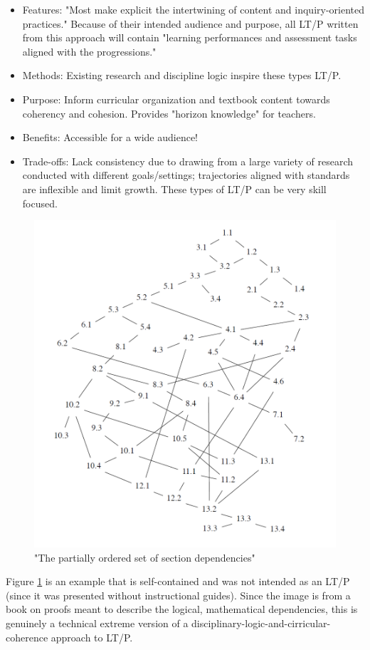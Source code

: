 \documentclass{TC}
\begin{document}
\begin{multicols}{2}
\begin{itemize} 
\item Features: "Most make explicit the intertwining of content and inquiry-oriented practices." Because of their intended audience and purpose, all LT/P written from this approach will contain "learning performances and assessment tasks aligned with the progressions."
\item Methods: Existing research and discipline logic inspire these types LT/P.
\item Purpose: Inform curricular organization and textbook content towards coherency and cohesion. Provides "horizon knowledge" for teachers. 
\item Benefits: Accessible for a wide audience!
\item Trade-offs: Lack consistency due to drawing from a large variety of research conducted with different goals/settings; trajectories aligned with standards are inflexible and limit growth. These types of LT/P can be very skill focused.  
 \end{itemize}
 \end{multicols}

\begin{figure}[h]
\centering
\includegraphics[width=.6\textwidth]{AoP_poset_of_section_dependencies} 
 \caption{"The partially ordered set of section dependencies" \parencite{beck_computing_2016}
\label{disciplinary_logic_LT_example}}
 \end{figure}
  
\begin{remark} Figure \ref{disciplinary_logic_LT_example} is an example that is self-contained and was not intended as an LT/P (since it was presented without instructional guides). Since the image is from a book on proofs meant to describe the logical, mathematical dependencies, this is genuinely a technical extreme version of a disciplinary-logic-and-cirricular-coherence approach to LT/P. \end{remark}
\end{document}

